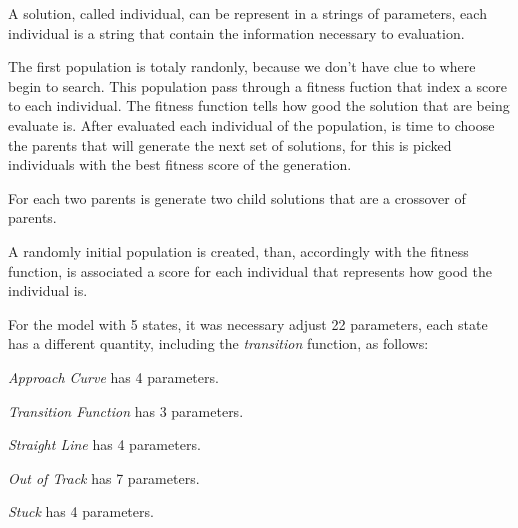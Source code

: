 	A solution, called individual, can be represent in a strings of parameters, each individual is a string that contain the information necessary to evaluation.
	
	The first population is totaly randonly, because we don't have clue to where begin to search. This population pass through a fitness fuction that index a score to each individual. The fitness function  tells how good the solution that are being evaluate is. After evaluated each individual of the population, is time to choose the parents that will generate the next set of solutions, for this is picked individuals with the best fitness score of the generation. 
	
	For each two parents is generate two child solutions that are a crossover of parents.
	
	A randomly initial population is created, than, accordingly with the fitness function, is associated a score for each individual that represents how good the individual is.	
	
	For the model with 5 states, it was necessary adjust 22 parameters, each state has a different quantity, including the \emph{transition} function, as follows:
	
	\emph{Approach Curve} has 4 parameters.
	
	\emph{Transition Function} has 3 parameters.
	
	\emph{Straight Line} has 4 parameters.
	
	\emph{Out of Track} has 7 parameters.
	
	\emph{Stuck} has 4 parameters.
	